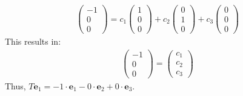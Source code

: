 \begin{enumerate}
\begin{enumerate}[label={(\alph*)}]
    \begin{align*}
        \begin{pmatrix} -1 \\ 0 \\ 0 \end{pmatrix} = c_1 \begin{pmatrix} 1 \\ 0 \\ 0 \end{pmatrix} + c_2 \begin{pmatrix} 0 \\ 1 \\ 0 \end{pmatrix} + c_3 \begin{pmatrix} 0 \\ 0 \\ 0 \end{pmatrix}
    \end{align*}
    This results in:
    \begin{align*}
        \begin{pmatrix} -1 \\ 0 \\ 0 \end{pmatrix} = \begin{pmatrix} c_1 \\ c_2 \\ c_3 \end{pmatrix}
    \end{align*}
    Thus, $T \mathbf{e}_1 = -1 \cdot \mathbf{e}_1 - 0 \cdot \mathbf{e}_2 + 0 \cdot \mathbf{e}_3$.
    

\end{enumerate}
\end{enumerate}
